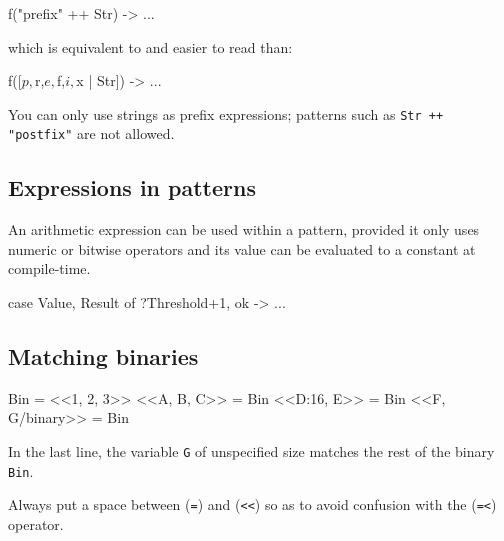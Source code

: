 \begin{erlang}
f("prefix" ++ Str) -> ...
\end{erlang}

which is equivalent to and easier to read than:

\begin{erlang}
f([$p,$r,$e,$f,$i,$x | Str]) -> ...
\end{erlang}

You can only use strings as prefix expressions; patterns such as \texttt{Str ++ "postfix"} are not allowed. 

\subsection{Expressions in patterns}
An arithmetic expression can be used within a pattern, provided it
only uses numeric or bitwise operators and its value can be evaluated
to a constant at compile-time.

\begin{erlang}
case {Value, Result} of
    {?Threshold+1, ok} -> ...   %
\end{erlang}

\subsection{Matching binaries}

\begin{erlang}
Bin = <<1, 2, 3>>               %
<<A, B, C>> = Bin               %
<<D:16, E>> = Bin               %
<<F, G/binary>> = Bin           %
\end{erlang}

In the last line, the variable \texttt{G} of unspecified size matches the
rest of the binary \texttt{Bin}.

Always put a space between (\texttt{=}) and (\verb|<<|) so as to
avoid confusion with the (\texttt{=<}) operator.

